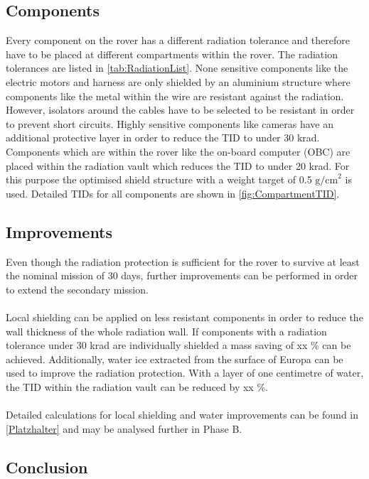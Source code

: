 \subsection{Components}

Every component on the rover has a different radiation tolerance and therefore have to be placed at different compartments within the rover. The radiation tolerances are listed in \autoref{tab:RadiationList}. None sensitive components like the electric motors and harness are only shielded by an aluminium structure where components like the metal within the wire are resistant against the radiation. However, isolators around the cables have to be selected to be resistant in order to prevent short circuits. Highly sensitive components like cameras have an additional protective layer in order to reduce the TID to under 30 krad. Components which are within the rover like the on-board computer (OBC) are placed within the radiation vault which reduces the TID to under 20 krad. For this purpose the optimised shield structure with a weight target of 0.5 \(\text{g/cm}^2\) is used. Detailed TIDs for all components are shown in \autoref{fig:CompartmentTID}.

\subsection{Improvements}

Even though the radiation protection is sufficient for the rover to survive at least the nominal mission of 30 days, further improvements can be performed in order to extend the secondary mission. \\ \\
Local shielding can be applied on less resistant components in order to reduce the wall thickness of the whole radiation wall. If components with a radiation tolerance under 30 krad are individually shielded a mass saving of xx \% can be achieved. Additionally, water ice extracted from the surface of Europa can be used to improve the radiation protection. With a layer of one centimetre of water, the TID within the radiation vault can be reduced by xx \%. \\ \\
Detailed calculations for local shielding and water improvements can be found in \autoref{Platzhalter} and may be analysed further in Phase B.

\subsection{Conclusion}

